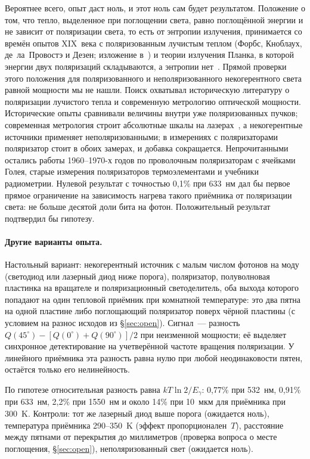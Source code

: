 \documentclass[11pt,a4paper]{article}
\newcommand{\Sref}[1]{\hyperref[#1]{\S\ref{#1}}}
\begin{document}
Вероятнее всего, опыт даст ноль, и этот ноль сам будет результатом. Положение о том, что тепло, выделенное при поглощении света, равно поглощённой энергии и не зависит от поляризации света, то есть от энтропии излучения, принимается со времён опытов XIX~века с поляризованным лучистым теплом (Форбс, Кноблаух, де~ла~Провостэ и Дезен; изложение в~\cite{desains1860}) и теории излучения Планка, в которой энергии двух поляризаций складываются, а энтропии нет~\cite{planck1914}. Прямой проверки этого положения для поляризованного и неполяризованного некогерентного света равной мощности мы не нашли. Поиск охватывал историческую литературу о поляризации лучистого тепла и современную метрологию оптической мощности. Исторические опыты сравнивали величины внутри уже поляризованных пучков; современная метрология строит абсолютные шкалы на лазерах~\cite{lehman2004,spidell2021}, а некогерентные источники применяет неполяризованными; в измерениях с поляризаторами поляризатор стоит в обоих замерах, и добавка сокращается. Непрочитанными остались работы 1960--1970-х годов по проволочным поляризаторам с ячейками Голея, старые измерения поляризаторов термоэлементами и учебники радиометрии. Нулевой результат с точностью 0,1\% при 633~нм дал бы первое прямое ограничение на зависимость нагрева такого приёмника от поляризации света: не больше десятой доли бита на фотон. Положительный результат подтвердил бы гипотезу.

\paragraph{Другие варианты опыта.}
Настольный вариант: некогерентный источник с малым числом фотонов на моду (светодиод или лазерный диод ниже порога), поляризатор, полуволновая пластинка на вращателе и поляризационный светоделитель, оба выхода которого попадают на один тепловой приёмник при комнатной температуре: это два пятна на одной пластине либо поглощающий поляризатор поверх чёрной пластины (с условием на разнос исходов из \Sref{sec:open}). Сигнал~--- разность $Q(45^\circ)-[Q(0^\circ)+Q(90^\circ)]/2$ при неизменной мощности; её выделяет синхронное детектирование на учетверённой частоте вращения поляризации. У линейного приёмника эта разность равна нулю при любой неодинаковости пятен, остаётся только его нелинейность.

По гипотезе относительная разность равна $kT\ln 2/E_\gamma$: 0,77\% при 532~нм, 0,91\% при 633~нм, 2,2\% при 1550~нм и около 14\% при 10~мкм для приёмника при 300~K. Контроли: тот же лазерный диод выше порога (ожидается ноль), температура приёмника 290--350~K (эффект пропорционален~$T$), расстояние между пятнами от перекрытия до миллиметров (проверка вопроса о месте поглощения, \Sref{sec:open}), неполяризованный свет (ожидается ноль).
\end{document}
